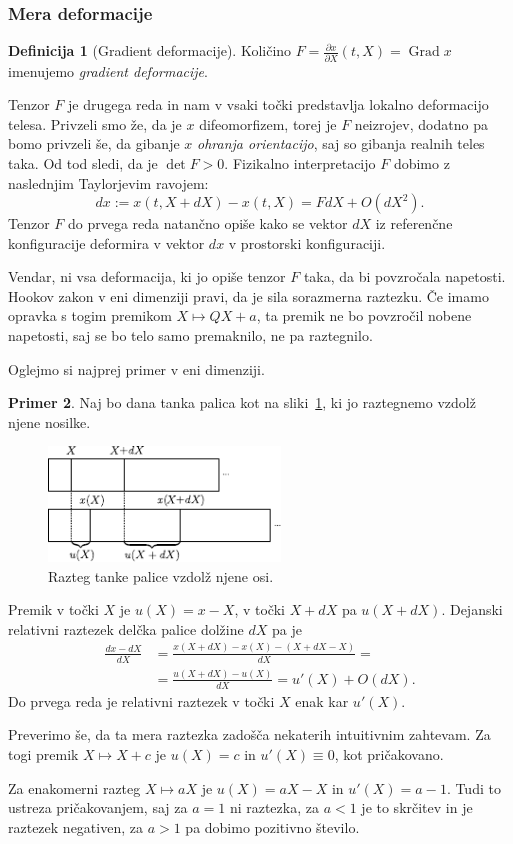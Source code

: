 \documentclass[12pt,a4paper]{article}
\theoremstyle{definition} %
\newtheorem{definicija}{Definicija}[section]
\newtheorem{primer}[definicija]{Primer}
\theoremstyle{plain} %
\numberwithin{equation}{section}
\newcommand{\Grad}{\operatorname{Grad}}
\newcommand{\dpar}[2]{\ensuremath{\frac{\partial #1}{\partial #2}}}
\begin{document}
\subsubsection{Mera deformacije}
\begin{definicija}[Gradient deformacije]
  Količino $F = \dpar{x}{X}(t, X) = \Grad x$ imenujemo \emph{gradient
  deformacije}.
\end{definicija}

Tenzor $F$ je drugega reda in nam v vsaki točki predstavlja lokalno deformacijo
telesa. Privzeli smo že, da je $x$ difeomorfizem, torej je $F$ neizrojev,
dodatno pa bomo privzeli še, da gibanje $x$ \emph{ohranja orientacijo}, saj
so gibanja realnih teles taka. Od tod sledi, da je $\det F > 0$.
Fizikalno interpretacijo $F$ dobimo z naslednjim Taylorjevim ravojem:
\[
  dx := x(t, X+dX) - x(t, X) = F dX + O(dX^2).
\]
Tenzor $F$ do prvega reda natančno opiše kako se vektor $dX$ iz referenčne
konfiguracije deformira v vektor $dx$ v prostorski konfiguraciji.

Vendar, ni vsa deformacija, ki jo opiše tenzor $F$ taka, da bi povzročala
napetosti. Hookov zakon v eni dimenziji pravi, da je sila sorazmerna raztezku.
Če imamo opravka s togim premikom $X \mapsto QX + a$, ta premik ne bo povzročil
nobene napetosti, saj se bo telo samo premaknilo, ne pa raztegnilo.

Oglejmo si najprej primer v eni dimenziji.
\begin{primer}
Naj bo dana tanka palica kot na sliki~\ref{fig:palica}, ki jo raztegnemo vzdolž
njene nosilke.
\begin{figure}[h]
  \centering
  \includegraphics[width=0.55\textwidth]{images/stretch1d.pdf}
  \caption{Razteg tanke palice vzdolž njene osi.}
  \label{fig:palica}
\end{figure}
Premik v točki $X$ je $u(X) = x - X$, v točki $X+dX$ pa $u(X+dX)$.
Dejanski relativni raztezek delčka palice dolžine $dX$ pa je
\begin{align*}
  \frac{dx - dX}{dX} &= \frac{x(X+dX) - x(X) - (X + dX - X)}{dX} = \\ &=
  \frac{u(X + dX) - u(X)}{dX} = u'(X) + O(dX).
\end{align*}
Do prvega reda je relativni raztezek v točki $X$ enak kar $u'(X)$.

Preverimo še, da ta mera raztezka zadošča nekaterih intuitivnim zahtevam. Za
togi premik $X \mapsto X + c$ je $u(X) = c$ in $u'(X) \equiv 0$, kot
pričakovano.

Za enakomerni razteg $X \mapsto aX$ je $u(X) = aX - X$ in $u'(X) = a - 1$. Tudi
to ustreza pričakovanjem, saj za $a = 1$ ni raztezka, za $a< 1$ je to skrčitev
in je raztezek negativen, za $a>1$ pa dobimo pozitivno število.
\end{primer}
\end{document}
